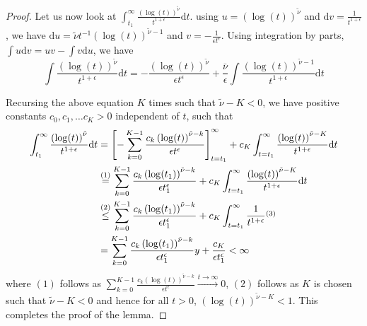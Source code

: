 \documentclass[twoside,11pt,english]{article}
\begin{document}
\begin{proof}
Let us now look at $\int_{t_1}^\infty\frac{\left(\log(t)\right)^{\tilde{\nu}}}{t^{1+\epsilon}} \mathrm{d}t$. using $u=\left(\log(t)\right)^{\tilde{\nu}}$ and $\mathrm{d}v=\frac{1}{t^{1+\epsilon}}$, we have $\mathrm{d}u=\tilde{\nu}t^{-1}\left(\log(t)\right)^{\tilde{\nu}-1}$ and $v=-\frac{1}{\epsilon t^{\epsilon}}$. Using integration by parts, $\int u\mathrm{d}v=uv-\int v\mathrm{d}u$, we have  
\[\int\frac{\left(\log(t)\right)^{\tilde{\nu}}}{t^{1+\epsilon}} \mathrm{d}t=-\frac{\left(\log(t)\right)^{\tilde{\nu}}}{\epsilon t^{\epsilon}}+\frac{\bar{\nu}}{\epsilon}\int \frac{\left(\log(t)\right)^{\tilde{\nu}-1}}{t^{1+\epsilon}} \mathrm{d}t
\]

Recursing the above equation $K$ times such that $\tilde{\nu}-K<0$, we have positive constants $c_0,c_1,\ldots c_K>0$ independent of $t$, such that
\begin{align}\label{eq:int-byparts}
\int_{t_1}^\infty\frac{\left(\log(t)\right)^{\tilde{\nu}}}{t^{1+\epsilon}} \mathrm{d}t&=\left[-\sum_{k=0}^{K-1}\frac{c_k\left(\log(t)\right)^{\tilde{\nu}-k}}{\epsilon t^{\epsilon}}\right]_{t=t_1}^\infty+c_K\int_{t=t_1}^\infty \frac{\left(\log(t)\right)^{\tilde{\nu}-K}}{t^{1+\epsilon}} \mathrm{d}t\nonumber\\
&\overset{(1)}=\sum_{k=0}^{K-1}\frac{c_k\left(\log(t_1)\right)^{\tilde{\nu}-k}}{\epsilon t_1^{\epsilon}}+c_K\int_{t=t_1}^\infty \frac{\left(\log(t)\right)^{\tilde{\nu}-K}}{t^{1+\epsilon}} \mathrm{d}t\nonumber\\
&\overset{(2)}\le\sum_{k=0}^{K-1}\frac{c_k\left(\log(t_1)\right)^{\tilde{\nu}-k}}{\epsilon t_1^{\epsilon}}+c_K\int_{t=t_1}^\infty \frac{1}{t^{1+\epsilon}}\overset{(3)}\nonumber\\
&=\sum_{k=0}^{K-1}\frac{c_k\left(\log(t_1)\right)^{\tilde{\nu}-k}}{\epsilon t_1^{\epsilon}}y+\frac{c_K}{\epsilon t_1^\epsilon}<\infty
\end{align}
where $(1)$ follows as $\sum_{k=0}^{K-1}\frac{c_k\left(\log(t)\right)^{\tilde{\nu}-k}}{\epsilon t^{\epsilon}}\overset{t\to\infty}\rightarrow 0$, $(2)$ follows as $K$ is chosen such that $\tilde{\nu}-K<0$ and hence for all $t>0$, $\left(\log(t)\right)^{\tilde{\nu}-K}<1$. This completes the proof of the lemma. 
\end{proof}
\Correlation*
\end{document}
